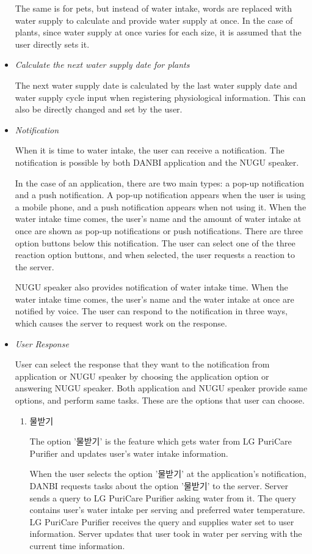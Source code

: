 \documentclass[conference]{IEEEtran}
\begin{document}
\begin{itemize}
The same is for pets, but instead of water intake, words are replaced with water supply to calculate and provide water supply at once.  In the case of plants, since water supply at once varies for each size, it is assumed that the user directly sets it.
\item \textit{Calculate the next water supply date for plants}

The next water supply date is calculated by the last water supply date and water supply cycle input when registering physiological information. This can also be directly changed and set by the user.
\item \textit{Notification}

When it is time to water intake, the user can receive a notification. The notification is possible by both DANBI application and the NUGU speaker.

In the case of an application, there are two main types: a pop-up notification and a push notification. A pop-up notification appears when the user is using a mobile phone, and a push notification appears when not using it. When the water intake time comes, the user's name and the amount of water intake at once are shown as pop-up notifications or push notifications. There are three option buttons below this notification. The user can select one of the three reaction option buttons, and when selected, the user requests a reaction to the server.

NUGU speaker also provides notification of water intake time. When the water intake time comes, the user's name and the water intake at once are notified by voice. The user can respond to the notification in three ways, which causes the server to request work on the response.
\item \textit{User Response}

User can select the response that they want to the notification from application or NUGU speaker by choosing the application option or answering NUGU speaker. Both application and NUGU speaker provide same options, and perform same tasks. These are the options that user can choose.
\begin{enumerate}
\setlength{\parindent}{2ex}
\setlength{\parskip}{0.5em}
\item 물받기

The option '물받기' is the feature which gets water from LG PuriCare Purifier and updates user's water intake information.

When the user selects the option '물받기' at the application's notification, DANBI requests tasks about the option '물받기' to the server. Server sends a query to LG PuriCare Purifier asking water from it. The query contains user's water intake per serving and preferred water temperature. LG PuriCare Purifier receives the query and supplies water set to user information. Server updates that user took in water per serving with the current time information.


\end{enumerate}
\end{itemize}
\end{document}
